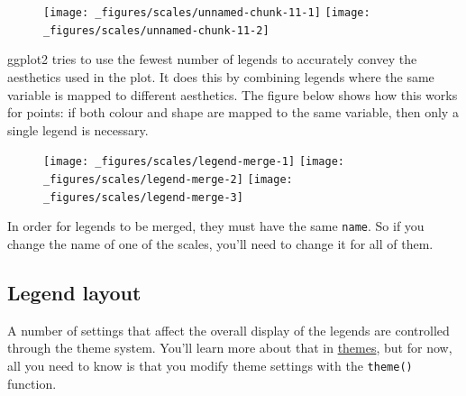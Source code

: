 \begin{figure}[H]
  \texttt{[image: \_figures/scales/unnamed-chunk-11-1]}%
  \texttt{[image: \_figures/scales/unnamed-chunk-11-2]}
\end{figure}

ggplot2 tries to use the fewest number of legends to accurately convey
the aesthetics used in the plot. It does this by combining legends where
the same variable is mapped to different aesthetics. The figure below
shows how this works for points: if both colour and shape are mapped to
the same variable, then only a single legend is necessary.

\begin{Shaded}
\begin{Highlighting}[]
\StringTok{ }\NormalTok{(}\NormalTok{(} 
\StringTok{ }\NormalTok{(}\NormalTok{(} 
\StringTok{ }\NormalTok{(}\NormalTok{(}  
\end{Highlighting}
\end{Shaded}

\begin{figure}[H]
  \texttt{[image: \_figures/scales/legend-merge-1]}%
  \texttt{[image: \_figures/scales/legend-merge-2]}%
  \texttt{[image: \_figures/scales/legend-merge-3]}
\end{figure}

In order for legends to be merged, they must have the same
\texttt{name}. So if you change the name of one of the scales, you'll
need to change it for all of them.

\subsection{Legend layout}\label{sub:legend-layout}

A number of settings that affect the overall display of the legends are
controlled through the theme system. You'll learn more about that in
\protect\hyperlink{sec:themes}{themes}, but for now, all you need to
know is that you modify theme settings with the \texttt{theme()}
function. 

